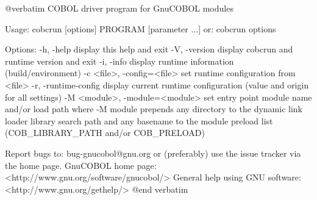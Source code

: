 @verbatim
COBOL driver program for GnuCOBOL modules

Usage: cobcrun [options] PROGRAM [parameter ...]
  or:  cobcrun options

Options:
  -h, -help                      display this help and exit
  -V, -version                   display cobcrun and runtime version and exit
  -i, -info                      display runtime information (build/environment)
  -c <file>, -config=<file>      set runtime configuration from <file>
  -r, -runtime-config            display current runtime configuration
                                 (value and origin for all settings)
  -M <module>, -module=<module>  set entry point module name and/or load path
                                 where -M module prepends any directory to the
                                 dynamic link loader library search path
                                 and any basename to the module preload list
                                 (COB_LIBRARY_PATH and/or COB_PRELOAD)

Report bugs to: bug-gnucobol@gnu.org
or (preferably) use the issue tracker via the home page.
GnuCOBOL home page: <http://www.gnu.org/software/gnucobol/>
General help using GNU software: <http://www.gnu.org/gethelp/>
@end verbatim
